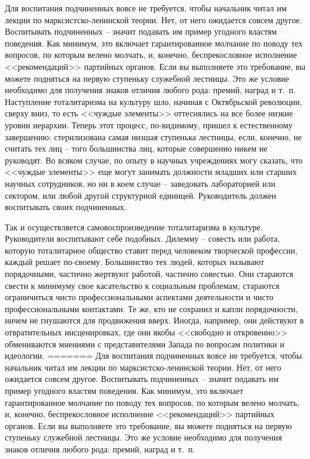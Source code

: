 \documentclass{book}
\begin{document}
Для воспитания подчиненных вовсе не требуется, чтобы начальник читал им лекции по марксистско‑ленинской теории. Нет, от него ожидается совсем другое. Воспитывать подчиненных -- значит подавать им пример угодного властям поведения. Как минимум, это включает гарантированное молчание по пово­ду тех вопросов, по которым велено молчать, и, конечно, беспрекословное исполнение <<рекомендаций>> партийных органов. Если вы выполняете это требование, вы можете подняться на первую ступеньку служебной лестницы. Это же условие необходимо для получения знаков отличия любого рода: премий, наград и т.~п.
Наступление тоталитаризма на культуру шло, начиная с Октябрьской революции, сверху вниз, то есть <<чуждые элементы>> оттеснялись на все более низкие уровни иерархии. Теперь этот процесс, по‑видимому, пришел к естественному завершению: стерилизована самая низшая ступенька лестницы, если, конечно, не считать тех лиц -- того большинства лиц, которые совершенно никем не руководят. Во всяком случае, по опыту в научных учреждениях могу сказать, что <<чуждые элементы>> еще могут занимать должности младших или старших научных сотрудников, но ни в коем случае -- заведовать лабораторией или сектором, или любой другой структурной единицей. Руководитель должен воспитывать своих подчиненных.

Так и осуществляется самовоспроизведение тоталитаризма в культуре. Руководители воспитывают себе подобных.
Дилемму -- совесть или работа, которую тоталитарное общество ставит перед человеком творческой профессии, каждый решает по‑своему. Большинство тех людей, которых называют порядочными, частично жертвуют работой, частично совестью. Они стараются свести к минимуму свое касательство к социальным проблемам, стараются ограничиться чисто профессиональными аспектами деятельности и чисто профессиональными контактами. Те же, кто не сохранил и капли порядочности, ничем не гнушаются для продвижения вверх. Иногда, например, они действуют в отвратительных инсценировках, где они якобы <<свободно и откровенно>> обмениваются мнениями с представителями Запада по вопросам политики и идеологии.
=======
Для воспитания подчиненных вовсе не требуется, чтобы начальник читал им лекции по марксистско-ленинской теории. Нет, от него ожидается совсем другое. Воспитывать подчиненных -- значит подавать им пример угодного властям поведения. Как минимум, это включает гарантированное молчание по пово­ду тех вопросов, по которым велено молчать, и, конечно, беспрекословное исполнение <<рекомендаций>> партийных органов. Если вы выполняете это требование, вы можете подняться на первую ступеньку служебной лестницы. Это же условие необходимо для получения знаков отличия любого рода: премий, наград и т.~п.
\end{document}
